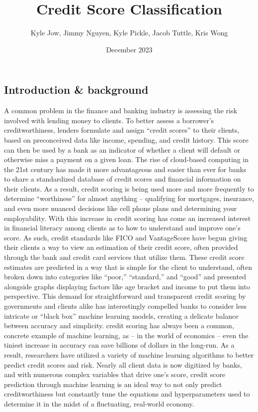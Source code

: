 \documentclass[11pt]{article}
\title{\textbf{Credit Score Classification}}
\author{Kyle Jow, Jimmy Nguyen, Kyle Pickle, Jacob Tuttle, Kris Wong}
\date{December 2023}
\begin{document}
\maketitle
\newpage
{}
\pagestyle{fancy}
\fancyhf{} %
\fancyfoot[R]{\thepage}
\begin{multicols}{2}
\section*{Introduction \& background}
A common problem in the finance and banking industry is assessing the risk involved with lending money to clients.
To better assess a borrower's creditworthiness, lenders formulate and assign “credit scores” to their clients, based on preconceived data 
like income, spending, and credit history.
This score can then be used by a bank as an indicator of whether a client will default or otherwise miss a payment on a given loan.
The rise of cloud-based computing in the 21st century has made it more advantageous and easier than ever for banks to share a
standardized database of credit scores and financial information on their clients.
As a result, credit scoring is being used more and more frequently to determine “worthiness” for almost anything -- qualifying for
mortgages, insurance, and even more nuanced decisions like cell phone plans and determining your employability.
\vspace{5mm}\newline
With this increase in credit scoring has come an increased interest in financial literacy among clients as to how to understand and improve
one's score.
As such, credit standards like FICO and VantageScore have begun giving their clients a way to view an estimation of their credit score, often
provided through the bank and credit card services that utilize them.
These credit score estimates are predicted in a way that is simple for the client to understand, often broken down into categories like
“poor,” “standard,” and “good” and presented alongside graphs displaying factors like age bracket and income to put them into perspective.
This demand for straightforward and transparent credit scoring by governments and clients alike has interestingly compelled banks to
consider less intricate or “black box” machine learning models, creating a delicate balance between accuracy and simplicity.
\vspace{5mm}\newline
credit scoring has always been a common, concrete example of machine learning, as -- in the world of economics -- even the tiniest increase
in accuracy can save billions of dollars in the long-run.
As a result, researchers have utilized a variety of machine learning algorithms to better predict credit scores and risk.
Nearly all client data is now digitized by banks, and with numerous complex variables that drive one's score, credit score prediction
through machine learning is an ideal way to not only predict creditworthiness but constantly tune the equations and hyperparameters used
to determine it in the midst of a fluctuating, real-world economy.


\end{multicols}
\end{document}

